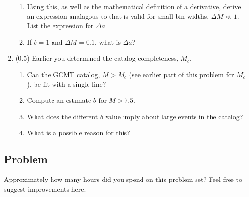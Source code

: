 \documentclass[11pt,titlepage,fleqn]{article}
\begin{document}
\begin{enumerate}
\begin{enumerate}
\item Using this, as well as the mathematical definition of a derivative, derive an expression analagous to  that is valid for small bin widths, $\Delta M \ll 1$. List the expression for $\Delta a$

\item If $b = 1$ and $\Delta M = 0.1$, what is $\Delta a$?

\end{enumerate}


\item (0.5) Earlier you determined the catalog completeness, $M_c$.
%
\begin{enumerate}
\item Can the GCMT catalog, $M > M_c$ (see earlier part of this problem for $M_c$), be fit with a single line?
\item Compute an estimate $b$ for $M > 7.5$.
\item What does the different $b$ value imply about large events in the catalog?
\item What is a possible reason for this?
\end{enumerate}

\end{enumerate}


\subsection*{Problem}

Approximately how many hours did you spend on this problem set? Feel free to suggest improvements here.




\end{document}
